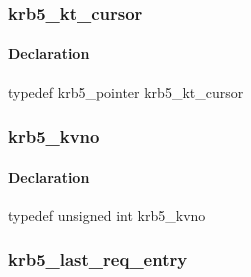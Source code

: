 \documentclass[letterpaper,10pt,english]{sphinxmanual}
\begin{document}
\subsubsection{krb5\_kt\_cursor}
\label{appdev/refs/types/krb5_kt_cursor:krb5-kt-cursor-struct}\label{appdev/refs/types/krb5_kt_cursor::doc}\label{appdev/refs/types/krb5_kt_cursor:krb5-kt-cursor}

\begin{fulllineitems}
\label{appdev/refs/types/krb5_kt_cursor:krb5_kt_cursor}
\end{fulllineitems}



\paragraph{Declaration}
\label{appdev/refs/types/krb5_kt_cursor:declaration}
typedef krb5\_pointer krb5\_kt\_cursor


\subsubsection{krb5\_kvno}
\label{appdev/refs/types/krb5_kvno:krb5-kvno}\label{appdev/refs/types/krb5_kvno::doc}\label{appdev/refs/types/krb5_kvno:krb5-kvno-struct}

\begin{fulllineitems}
\label{appdev/refs/types/krb5_kvno:krb5_kvno}
\end{fulllineitems}



\paragraph{Declaration}
\label{appdev/refs/types/krb5_kvno:declaration}
typedef unsigned int krb5\_kvno


\subsubsection{krb5\_last\_req\_entry}
\label{appdev/refs/types/krb5_last_req_entry:krb5-last-req-entry}\label{appdev/refs/types/krb5_last_req_entry::doc}\label{appdev/refs/types/krb5_last_req_entry:krb5-last-req-entry-struct}

\begin{fulllineitems}
\label{appdev/refs/types/krb5_last_req_entry:krb5_last_req_entry}
\end{fulllineitems}
\end{document}
